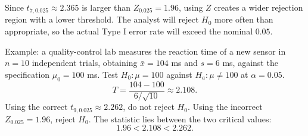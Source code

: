 \begin{solproblema}
Since $t_{7,0.025}\approx2.365$ is larger than $Z_{0.025}=1.96$, using $Z$ creates a wider rejection region with a lower threshold. The analyst will reject $H_0$ more often than appropriate, so the actual Type I error rate will exceed the nominal $0.05$.
\end{solproblema}

\begin{solproblema}[prob:cb4980c]
Example: a quality-control lab measures the reaction time of a new sensor in $n=10$ independent trials, obtaining $\bar x=104$ ms and $s=6$ ms, against the specification $\mu_0=100$ ms. Test $H_0:\mu=100$ against $H_a:\mu\ne100$ at $\alpha=0.05$.
\[
	T=\frac{104-100}{6/\sqrt{10}}\approx2.108.
\]
Using the correct $t_{9,0.025}\approx2.262$, do not reject $H_0$. Using the incorrect $Z_{0.025}=1.96$, reject $H_0$. The statistic lies between the two critical values:
\[
	1.96<2.108<2.262.
\]
\end{solproblema}
